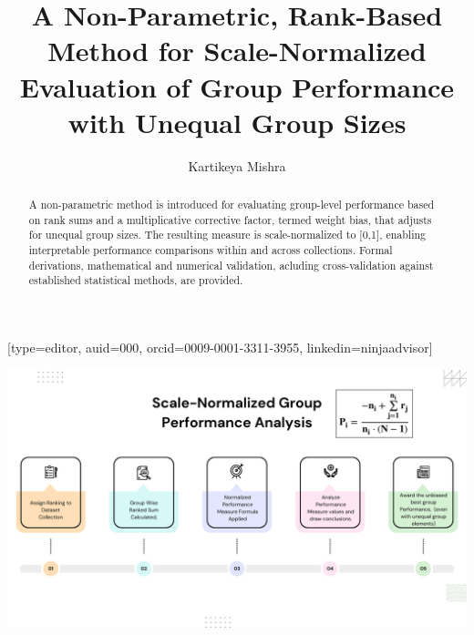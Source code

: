 \documentclass[a4paper,fleqn,review]{cas-sc}
\begin{document}
\let\WriteBookmarks\relax
\def\floatpagepagefraction{1}
\def\textpagefraction{.001}


\title [mode = title]{A Non-Parametric, Rank-Based Method for Scale-Normalized Evaluation of Group Performance with Unequal Group Sizes}            
\tnotemark[1]


\author[1]{Kartikeya Mishra}[type=editor,
auid=000,
orcid=0009-0001-3311-3955,
linkedin=ninjaadvisor]



\credit{}

\begin{abstract}
	 A non-parametric method is introduced for evaluating group-level performance based on rank sums and a multiplicative corrective factor, termed weight bias, that adjusts for unequal group sizes. The resulting measure is scale-normalized to [0,1], enabling interpretable performance comparisons within and across collections. Formal derivations, mathematical and numerical validation, acluding cross-validation against established statistical methods, are provided.
\end{abstract}

\begin{graphicalabstract}
	\centering
	\includegraphics[scale=0.33]{Graphical-Abstract-for-Group-Performance-Analysis}
\end{graphicalabstract}
\end{document}
